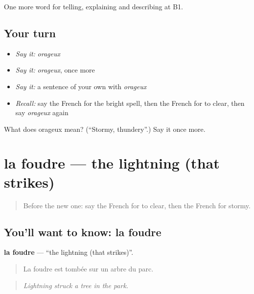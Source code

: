 \begin{grammarlens}[title={What you've built}]
One more word for telling, explaining and describing at B1.
\end{grammarlens}

\subsection*{Your turn}
\begin{itemize}
\raggedright
  \item \emph{Say it:} \emph{orageux}
  \item \emph{Say it:} \emph{orageux}, once more
  \item \emph{Say it:} a sentence of your own with \emph{orageux}
  \item \emph{Recall:} say the French for the bright spell, then the French for to clear, then say \emph{orageux} again
\end{itemize}

\begin{tcolorbox}[breakable,colback=teal!4,colframe=teal!35!black,title={Before you move on}]
What does orageux mean? (\textquotedblleft{}Stormy, thundery\textquotedblright{}.) Say it once more.
\end{tcolorbox}
\section[la foudre]{la foudre — the lightning (that strikes)}

\label{lesson:FR-C462-foudre}



\begin{quote}
Before the new one: say the French for to clear, then the French for stormy.
\end{quote}

\subsection*{You'll want to know: la foudre}
\textbf{la foudre} — \textquotedblleft{}the lightning (that strikes)\textquotedblright{}.

\begin{quote}
La foudre est tombée sur un arbre du parc.
\end{quote}

\begin{quote}
\emph{Lightning struck a tree in the park.}
\end{quote}

